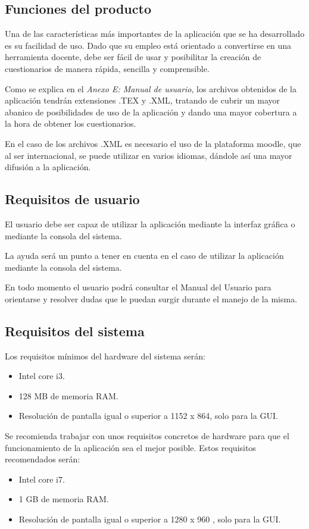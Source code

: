 \subsection{Funciones del producto}
Una de las características más importantes de la aplicación que se ha  desarrollado es su facilidad de uso. 
Dado que su empleo está orientado a convertirse en una herramienta docente, debe ser fácil de usar y posibilitar la creación de cuestionarios de manera rápida, sencilla y comprensible.

Como se explica en el \textit{Anexo E: Manual de usuario}, los archivos obtenidos de la aplicación tendrán extensiones .TEX y .XML, tratando de cubrir un mayor abanico de posibilidades de uso de la aplicación y dando una mayor cobertura a la hora de obtener los cuestionarios.

En el caso de los archivos .XML es necesario el uso de la plataforma moodle, que al ser internacional, se puede utilizar en varios idiomas, dándole así una mayor difusión a la aplicación.

\subsection{Requisitos de usuario}
El usuario debe ser capaz de utilizar la aplicación mediante la interfaz gráfica o mediante la consola del sistema. 

La ayuda será un punto a tener en cuenta en el caso de utilizar la aplicación mediante la consola del sistema.
 
En todo momento el usuario podrá consultar el Manual del Usuario para
orientarse y resolver dudas que le puedan surgir durante el manejo de la misma.

\subsection{Requisitos del sistema}
Los requisitos mínimos del hardware del sistema serán:
\begin{itemize}
\item Intel core i3.
\item 128 MB  de memoria RAM.
\item Resolución de pantalla igual o superior a 1152 x 864, solo para la GUI.
\end{itemize}

Se recomienda trabajar con unos requisitos concretos de hardware para que el funcionamiento de la aplicación sea el mejor posible. Estos requisitos recomendados serán:
\begin{itemize}
\item Intel core i7.
\item 1 GB de memoria RAM.
\item Resolución de pantalla igual o superior a 1280 x 960 , solo para la GUI.
\end{itemize}

